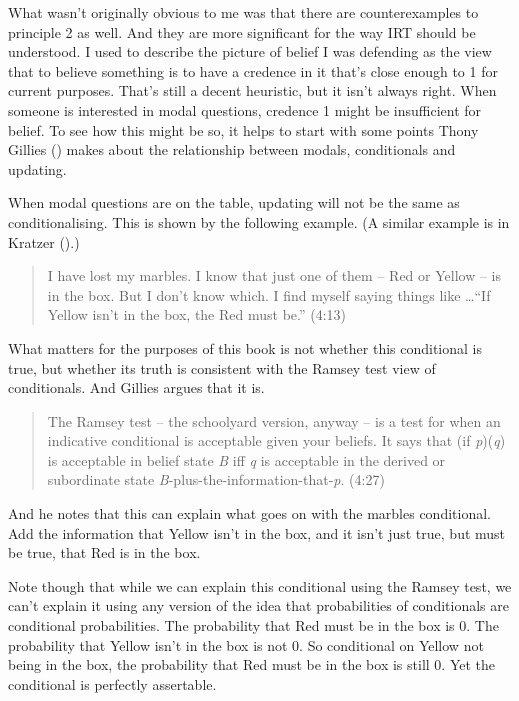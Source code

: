 \documentclass[
  12pt,
  letterpaper,
]{scrbook}
\begin{document}
What wasn't originally obvious to me was that there are counterexamples
to principle 2 as well. And they are more significant for the way IRT
should be understood. I used to describe the picture of belief I was
defending as the view that to believe something is to have a credence in
it that's close enough to 1 for current purposes. That's still a decent
heuristic, but it isn't always right. When someone is interested in
modal questions, credence 1 might be insufficient for belief. To see how
this might be so, it helps to start with some points Thony Gillies
() makes about the relationship between
modals, conditionals and updating.

When modal questions are on the table, updating will not be the same as
conditionalising. This is shown by the following example. (A similar
example is in Kratzer ().)

\begin{quote}
I have lost my marbles. I know that just one of them -- Red or Yellow --
is in the box. But I don't know which. I find myself saying things like
\ldots{}``If Yellow isn't in the box, the Red must be.'' (4:13)
\end{quote}

What matters for the purposes of this book is not whether this
conditional is true, but whether its truth is consistent with the Ramsey
test view of conditionals. And Gillies argues that it is.

\begin{quote}
The Ramsey test -- the schoolyard version, anyway -- is a test for when
an indicative conditional is acceptable given your beliefs. It says that
(if \emph{p})(\emph{q}) is acceptable in belief state \emph{B} iff
\emph{q} is acceptable in the derived or subordinate state
\emph{B}-plus-the-information-that-\emph{p}. (4:27)
\end{quote}

And he notes that this can explain what goes on with the marbles
conditional. Add the information that Yellow isn't in the box, and it
isn't just true, but must be true, that Red is in the box.

Note though that while we can explain this conditional using the Ramsey
test, we can't explain it using any version of the idea that
probabilities of conditionals are conditional probabilities. The
probability that Red must be in the box is 0. The probability that
Yellow isn't in the box is not 0. So conditional on Yellow not being in
the box, the probability that Red must be in the box is still 0. Yet the
conditional is perfectly assertable.
\end{document}
